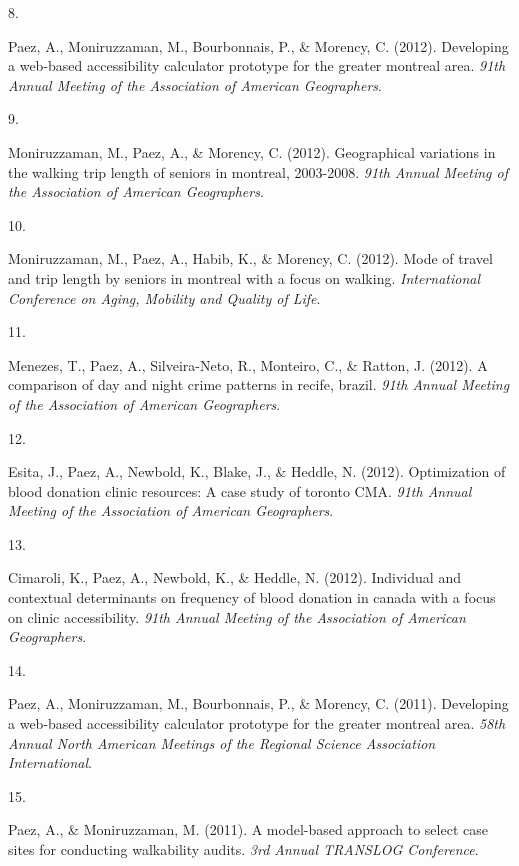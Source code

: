 \documentclass[10pt,a4paper,]{twentysecondcv}
\newlength{\csllabelwidth}
\newcommand{\CSLLeftMargin}[1]{\parbox[t]{\csllabelwidth}{#1}}
\newcommand{\CSLRightInline}[1]{\parbox[t]{\linewidth - \csllabelwidth}{#1}}
\begin{document}
\leavevmode{}%
\CSLLeftMargin{8. }%
\CSLRightInline{Paez, A., Moniruzzaman, M., Bourbonnais, P., \& Morency,
C. (2012). Developing a web-based accessibility calculator prototype for
the greater montreal area. \emph{91th Annual Meeting of the Association
of American Geographers}.}

\leavevmode{}%
\CSLLeftMargin{9. }%
\CSLRightInline{Moniruzzaman, M., Paez, A., \& Morency, C. (2012).
Geographical variations in the walking trip length of seniors in
montreal, 2003-2008. \emph{91th Annual Meeting of the Association of
American Geographers}.}

\leavevmode{}%
\CSLLeftMargin{10. }%
\CSLRightInline{Moniruzzaman, M., Paez, A., Habib, K., \& Morency, C.
(2012). Mode of travel and trip length by seniors in montreal with a
focus on walking. \emph{International Conference on Aging, Mobility and
Quality of Life}.}

\leavevmode{}%
\CSLLeftMargin{11. }%
\CSLRightInline{Menezes, T., Paez, A., Silveira-Neto, R., Monteiro, C.,
\& Ratton, J. (2012). A comparison of day and night crime patterns in
recife, brazil. \emph{91th Annual Meeting of the Association of American
Geographers}.}

\leavevmode{}%
\CSLLeftMargin{12. }%
\CSLRightInline{Esita, J., Paez, A., Newbold, K., Blake, J., \& Heddle,
N. (2012). Optimization of blood donation clinic resources: A case study
of toronto CMA. \emph{91th Annual Meeting of the Association of American
Geographers}.}

\leavevmode{}%
\CSLLeftMargin{13. }%
\CSLRightInline{Cimaroli, K., Paez, A., Newbold, K., \& Heddle, N.
(2012). Individual and contextual determinants on frequency of blood
donation in canada with a focus on clinic accessibility. \emph{91th
Annual Meeting of the Association of American Geographers}.}

\leavevmode{}%
\CSLLeftMargin{14. }%
\CSLRightInline{Paez, A., Moniruzzaman, M., Bourbonnais, P., \& Morency,
C. (2011). Developing a web-based accessibility calculator prototype for
the greater montreal area. \emph{58th Annual North American Meetings of
the Regional Science Association International}.}

\leavevmode{}%
\CSLLeftMargin{15. }%
\CSLRightInline{Paez, A., \& Moniruzzaman, M. (2011). A model-based
approach to select case sites for conducting walkability audits.
\emph{3rd Annual TRANSLOG Conference}.}
\end{document}
